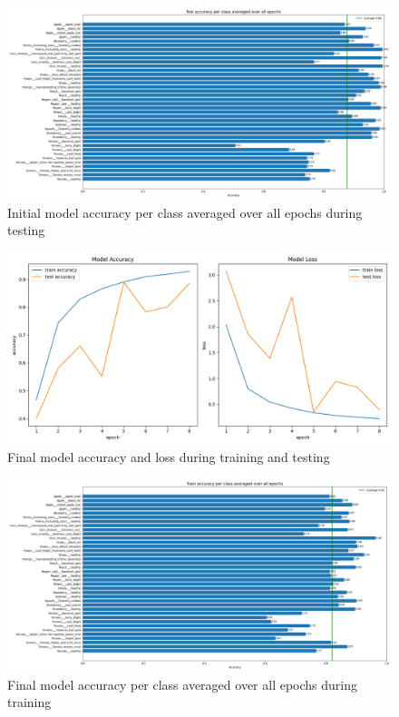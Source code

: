 \documentclass{BachelorBUI}
\begin{document}
    \begin{figure}[h]
        \centering
        \includegraphics[width=\textwidth]{initial_test_accuracy_per_class_2024-11-25_07.55.35.png}
        \caption{\centering Initial model accuracy per class averaged over all epochs during testing}
        \label{fig:initial_test_accuracy_per_class}
    \end{figure}
    \begin{figure}[h]
        \centering
        \includegraphics[width=\textwidth]{final_accuracy_and_loss_2024-11-25_11.16.13.png}
        \caption{\centering Final model accuracy and loss during training and testing}
        \label{fig:final_accuracy_and_loss}
    \end{figure}
    \begin{figure}[h]
        \centering
        \includegraphics[width=\textwidth]{final_train_accuracy_per_class_2024-11-25_11.16.13.png}
        \caption{\centering Final model accuracy per class averaged over all epochs during training}
        \label{fig:final_train_accuracy_per_class}
    \end{figure}
\end{document}

